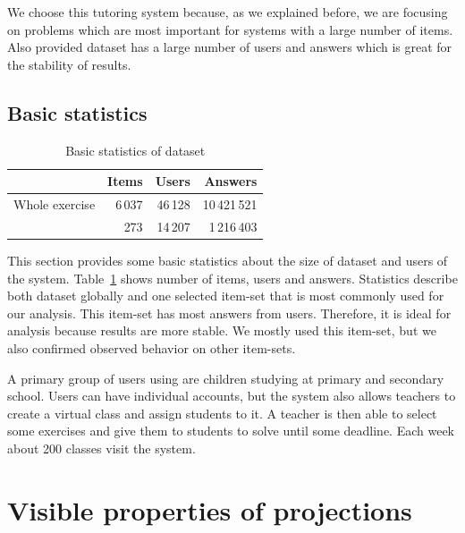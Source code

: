 \documentclass[
  print, %
  table,   %
  nolof,     %
  nolot,     %
  nocover,
  color,
  final,
]{fithesis3}
\begin{document}

We choose this tutoring system because, as we explained before, we are focusing on problems which are most important for systems with a large number of items. Also provided dataset has a large number of users and answers which is great for the stability of results.


\subsection{Basic statistics}\label{basic-statistics}

\begin{table}
  \begin{tabular}{|l|r r r|}
    \hline
    \cellcolor[gray]{1.0} & Items & Users & Answers \\
    \hline
    Whole exercise & 6\,037 & 46\,128 & 10\,421\,521 \\
    \cviceniB{} & 273 & 14\,207 & 1\,216\,403 \\
    \hline
  \end{tabular}
  \caption{Basic statistics of dataset}
  \label{tab:basic-statistics}
\end{table}

This section provides some basic statistics about the size of dataset and users of the system. Table~\ref{tab:basic-statistics} shows number of items, users and answers. Statistics describe both dataset globally and one selected item-set \cviceniB{} that is most commonly used for our analysis. This item-set has most answers from users. Therefore, it is ideal for analysis because results are more stable. We mostly used this item-set, but we also confirmed observed behavior on other item-sets.


A primary group of users using \umimeCesky{} are children studying at primary and secondary school. Users can have individual accounts, but the system also allows teachers to create a virtual class and assign students to it. A teacher is then able to select some exercises and give them to students to solve until some deadline. Each week about 200 classes visit the system.


\section{Visible properties of projections}\label{visible-properties-of-projections}
\end{document}
